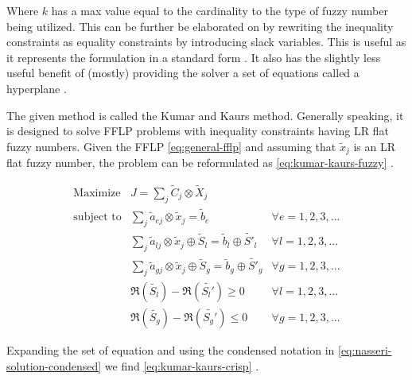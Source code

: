 \documentclass[11pt,a4paper,final]{article}
\let\ref\autoref                                      %
\begin{document}
Where \(k\) has a max value equal to the cardinality to the type of fuzzy number being utilized. This can be further be
elaborated on by rewriting the inequality constraints as equality constraints by introducing slack variables. This is
useful as it represents the formulation in a standard form \cite{chen-2010-applied,vanderbei-2020-linear-progr}. It
also has the slightly less useful benefit of (mostly) providing the solver a set of equations called a hyperplane
\cite{chen-2010-applied}.

The given method is called the Kumar and Kaurs method. Generally speaking, it is designed to solve FFLP problems with
inequality constraints having LR flat fuzzy numbers. Given the FFLP \ref{eq:general-fflp} and assuming that
\(\tilde{x}_j\) is an LR flat fuzzy number, the problem can be reformulated as \ref{eq:kumar-kaurs-fuzzy}
\cite{kaur-2016-introd-fuzzy}.

\begin{equation}
\label{eq:kumar-kaurs-fuzzy}
\begin{array}{lll}
\text{Maximize}   & J = \sum_j \tilde{C}_j \otimes \tilde{X}_j              &                                              \\
\text{subject to} & \sum_j \tilde{a}_{ej} \otimes \tilde{x}_j               = \tilde{b}_e & \forall e = 1,2,3,...                \\
                  & \sum_j \tilde{a}_{lj} \otimes \tilde{x}_j \oplus \tilde{S}_l = \tilde{b}_l \oplus \tilde{S'}_l & \forall l = 1,2,3,... \\
                  & \sum_j \tilde{a}_{gj} \otimes \tilde{x}_j \oplus \tilde{S}_g = \tilde{b}_g \oplus \tilde{S'}_g & \forall g = 1,2,3,... \\
                  & \mathfrak{R}(\tilde{S_l}) - \mathfrak{R}(\tilde{S_l'}) \ge 0                                     & \forall l = 1,2,3,...      \\
                  & \mathfrak{R}(\tilde{S_g}) - \mathfrak{R}(\tilde{S_g'}) \le 0                                     & \forall g = 1,2,3,...
\end{array}
\end{equation}

Expanding the set of equation and using the condensed notation in \ref{eq:nasseri-solution-condensed} we find
\ref{eq:kumar-kaurs-crisp} \cite{kaur-2016-introd-fuzzy}.
\end{document}
